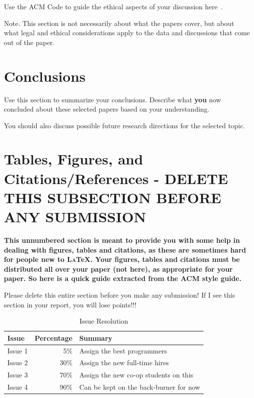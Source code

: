 \documentclass[sigconf, anonymous]{acmart}
\def\LaTeX{\textsc{La}\TeX}
\begin{document}
Use the ACM Code to guide the ethical aspects of your
discussion here~\cite{ACMCODE}.

Note. This section is not necessarily about what the papers cover, but
about what legal and ethical considerations apply to the data and
discussions that come out of the paper.

\section{Conclusions}
\label{conclusions}

Use this section to summarize your conclusions. Describe what {\bf
  you} now concluded about these selected papers based on your
understanding.

You should also discuss possible future research directions for the
selected topic.



\section*{Tables, Figures, and Citations/References -
  DELETE THIS SUBSECTION BEFORE ANY SUBMISSION}

{\bf This unnumbered section is meant to provide you with some help in
  dealing with figures, tables and citations, as these are sometimes
  hard for people new to \LaTeX. Your figures, tables and citations
  must be distributed all over your paper (not here), as appropriate
  for your paper. So here is a quick guide extracted from the ACM
  style guide.

  Please delete this entire section before you make any submission! If
  I see this section in your report, you will lose points!!!}

\begin{table}
\centering
\caption{Issue Resolution}
\label{SAMPLE TABLE}
\begin{tabular}{|l|r|l|} \hline
Issue&Percentage&Summary\\ \hline
Issue 1 &  5\% & Assign the best programmers\\ \hline
Issue 2 &  30\% & Assign the new full-time hires\\ \hline
Issue 3 &  70\% & Assign the new co-op students on this\\ \hline
Issue 4 &  90\% & Can be kept on the back-burner for now\\ \hline
\end{tabular}
\end{table}
\end{document}
